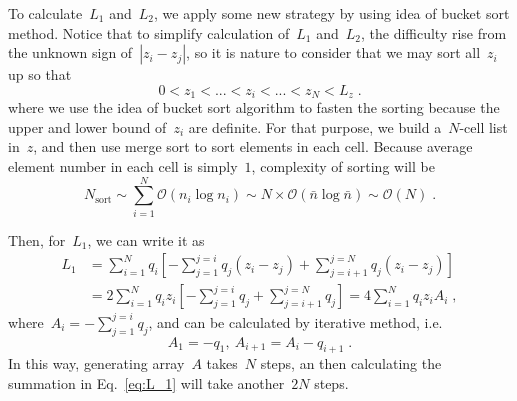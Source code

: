 \documentclass[aps,prl,reprint,showpacs,floatfix,superscriptaddress, onecolumn]{revtex4-2}
\newcommand{\abs}[1]{\left|#1\right|} %
\begin{document}
To calculate~$L_1$ and~$L_2$, we apply some new strategy by using idea of bucket sort method.
Notice that to simplify calculation of~$L_1$ and~$L_2$, the difficulty rise from the unknown sign of~$\abs{z_i - z_j}$, so it is nature to consider that we may sort all~$z_i$ up so that
\begin{equation}
    0 < z_1 < ... < z_i < ...  < z_N < L_z\;.
\end{equation}
where we use the idea of bucket sort algorithm to fasten the sorting because the upper and lower bound of~$z_i$ are definite.
For that purpose, we build a~$N$-cell list in~$z$, and then use merge sort to sort elements in each cell. 
Because average element number in each cell is simply~$1$, complexity of sorting will be
\begin{equation}
    N_{\text{sort}} \sim \sum_{i = 1}^{N} \mathcal{O}(n_i \log n_i) \sim N \times \mathcal{O}(\bar{n} \log \bar{n}) \sim \mathcal{O}(N)\;.
\end{equation}

Then, for~$L_1$, we can write it as
\begin{equation}
\begin{split}\label{eq:L_1}
    L_1 & = \sum_{i = 1}^{N} q_i \left[ - \sum_{j = 1}^{j = i} q_j (z_i - z_j) + \sum_{j = i+1}^{j = N} q_j (z_i - z_j) \right] \\
    & = 2 \sum_{i = 1}^{N} q_i z_i \left[ - \sum_{j = 1}^{j = i}q_j + \sum_{j = i+1}^{j = N} q_j \right] = 4 \sum_{i = 1}^{N} q_i z_i A_i \;,
\end{split}
\end{equation}
where~$A_i = - \sum_{j = 1}^{j = i}q_j$, and can be calculated by iterative method, i.e.
\begin{equation}\label{eq:A}
    A_1 = - q_1,~A_{i + 1} = A_i - q_{i + 1}\;.
\end{equation}
In this way, generating array~$A$ takes~$N$ steps, an then calculating the summation in Eq.~\eqref{eq:L_1} will take another~$2N$ steps.
\end{document}
